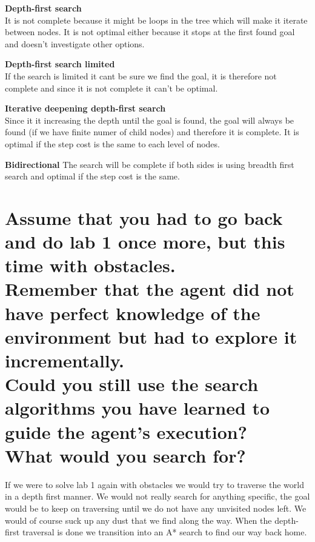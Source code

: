 \documentclass{article}
\begin{document}
\textbf{Depth-first search}\\
It is not complete because it might be loops in the tree which will make it iterate between nodes. It is not optimal either because it stops at the first
found goal and doesn't investigate other options. 

\textbf{Depth-first search limited}\\
If the search is limited it cant be sure we find the goal, it is therefore not complete and since it is not complete it can't be optimal.

\textbf{Iterative deepening depth-first search}\\
Since it it increasing the depth until the goal is found, the goal will always be found (if we have finite numer of child nodes) and therefore it is complete.
It is optimal if the step cost is the same to each level of nodes. 

\textbf{Bidirectional}
The search will be complete if both sides is using breadth first search and optimal if the step cost is the same. 

\section*{Assume that you had to go back and do lab 1 once more, but this time with obstacles.\\Remember that the agent did not have perfect knowledge of the
environment but had to explore it incrementally.\\Could you still use the search algorithms you have learned to guide the agent's execution?\\What would you search for?}

If we were to solve lab 1 again with obstacles we would try to traverse the world in a depth first manner. We would not really search for anything specific,
the goal would be to keep on traversing until we do not have any unvisited nodes left. We would of course suck up any dust that we find along the way.
When the depth-first traversal is done we transition into an A* search to find our way back home.
\end{document}

